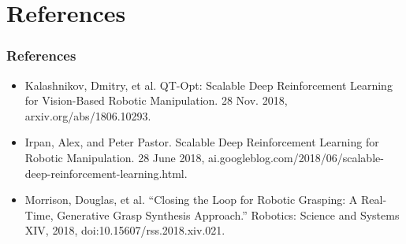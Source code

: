 \documentclass{beamer}
\newcommand{\refSec}{References}
\begin{document}
  \section{\refSec}
    \begin{frame}
      \frametitle{References}
      \begin{itemize}
        \item Kalashnikov, Dmitry, et al. QT-Opt: Scalable Deep Reinforcement Learning for Vision-Based Robotic Manipulation. 28 Nov. 2018, arxiv.org/abs/1806.10293.
        \item Irpan, Alex, and Peter Pastor. Scalable Deep Reinforcement Learning for Robotic Manipulation. 28 June 2018, ai.googleblog.com/2018/06/scalable-deep-reinforcement-learning.html.
        \item Morrison, Douglas, et al. “Closing the Loop for Robotic Grasping: A Real-Time, Generative Grasp Synthesis Approach.” Robotics: Science and Systems XIV, 2018, doi:10.15607/rss.2018.xiv.021.
      \end{itemize}
    \end{frame}
\end{document}
